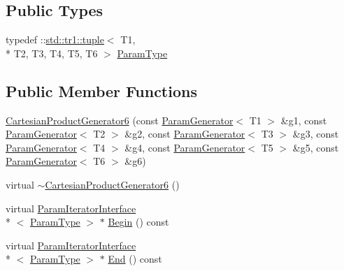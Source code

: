 \subsection*{Public Types}
\begin{DoxyCompactItemize}
\item 
typedef \-::\hyperlink{classstd_1_1tr1_1_1tuple}{std\-::tr1\-::tuple}$<$ T1, \\*
T2, T3, T4, T5, T6 $>$ \hyperlink{classtesting_1_1internal_1_1CartesianProductGenerator6_a308164858b18868e45abab2f168b92db}{Param\-Type}
\end{DoxyCompactItemize}
\subsection*{Public Member Functions}
\begin{DoxyCompactItemize}
\item 
\hyperlink{classtesting_1_1internal_1_1CartesianProductGenerator6_a6ff15d46e4ff7f8f24215b8244a6a094}{Cartesian\-Product\-Generator6} (const \hyperlink{classtesting_1_1internal_1_1ParamGenerator}{Param\-Generator}$<$ T1 $>$ \&g1, const \hyperlink{classtesting_1_1internal_1_1ParamGenerator}{Param\-Generator}$<$ T2 $>$ \&g2, const \hyperlink{classtesting_1_1internal_1_1ParamGenerator}{Param\-Generator}$<$ T3 $>$ \&g3, const \hyperlink{classtesting_1_1internal_1_1ParamGenerator}{Param\-Generator}$<$ T4 $>$ \&g4, const \hyperlink{classtesting_1_1internal_1_1ParamGenerator}{Param\-Generator}$<$ T5 $>$ \&g5, const \hyperlink{classtesting_1_1internal_1_1ParamGenerator}{Param\-Generator}$<$ T6 $>$ \&g6)
\item 
virtual \hyperlink{classtesting_1_1internal_1_1CartesianProductGenerator6_a1a66fab3ddc3c2c00e2c2f53fc5ee96d}{$\sim$\-Cartesian\-Product\-Generator6} ()
\item 
virtual \hyperlink{classtesting_1_1internal_1_1ParamIteratorInterface}{Param\-Iterator\-Interface}\\*
$<$ \hyperlink{classtesting_1_1internal_1_1CartesianProductGenerator6_a308164858b18868e45abab2f168b92db}{Param\-Type} $>$ $\ast$ \hyperlink{classtesting_1_1internal_1_1CartesianProductGenerator6_a95db6741abce1e68cfba9ed2789938fe}{Begin} () const 
\item 
virtual \hyperlink{classtesting_1_1internal_1_1ParamIteratorInterface}{Param\-Iterator\-Interface}\\*
$<$ \hyperlink{classtesting_1_1internal_1_1CartesianProductGenerator6_a308164858b18868e45abab2f168b92db}{Param\-Type} $>$ $\ast$ \hyperlink{classtesting_1_1internal_1_1CartesianProductGenerator6_acea48e3f002281d8f8abcd5e586dce92}{End} () const 
\end{DoxyCompactItemize}


